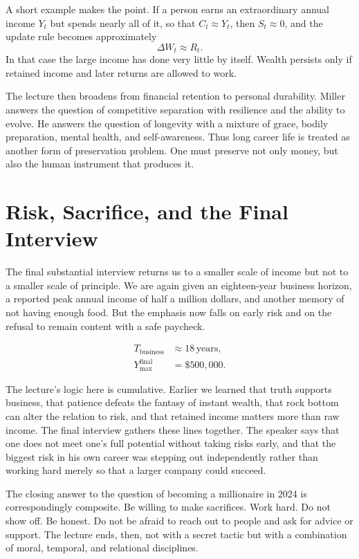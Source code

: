 A short example makes the point. If a person earns an extraordinary annual income \(Y_t\) but spends nearly all of it, so that \(C_t \approx Y_t\), then \(S_t \approx 0\), and the update rule becomes approximately
\[
\Delta W_t \approx R_t.
\]
In that case the large income has done very little by itself. Wealth persists only if retained income and later returns are allowed to work.

The lecture then broadens from financial retention to personal durability. Miller answers the question of competitive separation with resilience and the ability to evolve. He answers the question of longevity with a mixture of grace, bodily preparation, mental health, and self-awareness. Thus long career life is treated as another form of preservation problem. One must preserve not only money, but also the human instrument that produces it.

\section{Risk, Sacrifice, and the Final Interview}

The final substantial interview returns us to a smaller scale of income but not to a smaller scale of principle. We are again given an eighteen-year business horizon, a reported peak annual income of half a million dollars, and another memory of not having enough food. But the emphasis now falls on early risk and on the refusal to remain content with a safe paycheck.

\begin{align}
T_{\mathrm{business}} &\approx 18\,\text{years},\\
Y_{\max}^{\mathrm{final}} &= \$500{,}000.
\end{align}

The lecture's logic here is cumulative. Earlier we learned that truth supports business, that patience defeats the fantasy of instant wealth, that rock bottom can alter the relation to risk, and that retained income matters more than raw income. The final interview gathers these lines together. The speaker says that one does not meet one's full potential without taking risks early, and that the biggest risk in his own career was stepping out independently rather than working hard merely so that a larger company could succeed.

The closing answer to the question of becoming a millionaire in 2024 is correspondingly composite. Be willing to make sacrifices. Work hard. Do not show off. Be honest. Do not be afraid to reach out to people and ask for advice or support. The lecture ends, then, not with a secret tactic but with a combination of moral, temporal, and relational disciplines.


